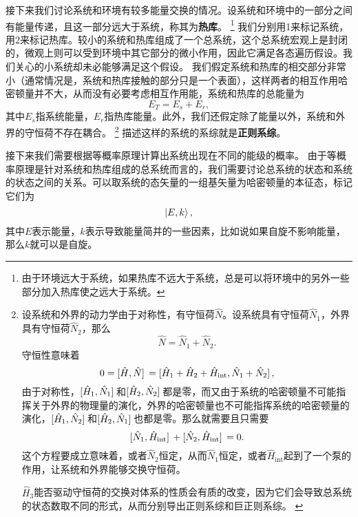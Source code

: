 \documentclass[hyperref, UTF8, a4paper]{ctexart}
\begin{document}
接下来我们讨论系统和环境有较多能量交换的情况。设系统和环境中的一部分之间有能量传递，且这一部分远大于系统，称其为\textbf{热库}。%
\footnote{由于环境远大于系统，如果热库不远大于系统，总是可以将环境中的另外一些部分加入热库使之远大于系统。}%
我们分别用1来标记系统，用2来标记热库。较小的系统和热库组成了一个总系统，这个总系统宏观上是封闭的，微观上则可以受到环境中其它部分的微小作用，因此它满足各态遍历假设。我们关心的小系统却未必能够满足这个假设。
我们假定系统和热库的相交部分非常小（通常情况是，系统和热库接触的部分只是一个表面），这样两者的相互作用哈密顿量并不大，从而没有必要考虑相互作用能，系统和热库的总能量为
\begin{equation}
    E_T = E_s + E_r,
    \label{eq:total-energy}
\end{equation}
其中$E_s$指系统能量，$E_r$指热库能量。此外，我们还假定除了能量以外，系统和外界的守恒荷不存在耦合。%
\footnote{设系统和外界的动力学由于对称性，有守恒荷$\hat{N}$。设系统具有守恒荷$\hat{N}_1$，外界具有守恒荷$\hat{N}_2$，那么
\[
    \hat{N} = \hat{N}_1 + \hat{N}_2.
\]
守恒性意味着
\[
    0 = \comm*{\hat{H}}{\hat{N}} = \comm*{\hat{H}_1 + \hat{H}_2 + \hat{H}_\text{int}}{\hat{N}_1 + \hat{N}_2},
\]
由于对称性，$\comm*{\hat{H}_1}{\hat{N}_1}$和$\comm*{\hat{H}_2}{\hat{N}_2}$都是零，而又由于系统的哈密顿量不可能指挥关于外界的物理量的演化，外界的哈密顿量也不可能指挥系统的哈密顿量的演化，$\comm*{\hat{H}_1}{\hat{N}_2}$和$\comm*{\hat{H}_2}{\hat{N}_1}$也都是零。那么就需要且只需要
\[
    \comm*{\hat{N}_1}{\hat{H}_\text{int}} + \comm*{\hat{N}_2}{\hat{H}_\text{int}} = 0.
\]
这个方程要成立意味着，或者$\hat{N}_2$恒定，从而$\hat{N}_1$恒定，或者$\hat{H}_\text{int}$起到了一个泵的作用，让系统和外界能够交换守恒荷。

$\hat{H}_3$能否驱动守恒荷的交换对体系的性质会有质的改变，因为它们会导致总系统的状态数取不同的形式，从而分别导出正则系综和巨正则系综。
\label{note:without-other-decoupling}}%
描述这样的系统的系综就是\textbf{正则系综}。

接下来我们需要根据等概率原理计算出系统出现在不同的能级的概率。
由于等概率原理是针对系统和热库组成的总系统而言的，我们需要讨论总系统的状态和系统的状态之间的关系。可以取系统的态矢量的一组基矢量为哈密顿量的本征态，标记它们为
\[
    \ket{E, k},
\]
其中$E$表示能量，$k$表示导致能量简并的一些因素，比如说如果自旋不影响能量，那么$k$就可以是自旋。
\end{document}
